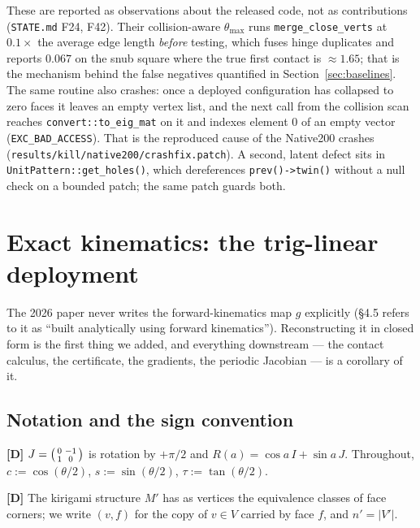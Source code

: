 \documentclass[11pt,a4paper]{article}
\theoremstyle{definition}
\newcommand{\Mprime}{M'}
\newcommand{\file}[1]{\texttt{\small #1}}
\begin{document}
These are reported as observations about the released code, not as contributions
(\file{STATE.md} F24, F42). Their collision-aware $\theta_{\max}$ runs
\file{merge\_close\_verts} at $0.1\times$ the average edge length \emph{before} testing,
which fuses hinge duplicates and reports $0.067$ on the snub square where the true first
contact is $\approx1.65$; that is the mechanism behind the false negatives quantified in
Section~\ref{sec:baselines}. The same routine also crashes: once a deployed configuration has
collapsed to zero faces it leaves an empty vertex list, and the next call from the collision
scan reaches \file{convert::to\_eig\_mat} on it and indexes element $0$ of an empty vector
(\texttt{EXC\_BAD\_ACCESS}). That is the reproduced cause of the Native200 crashes
(\file{results/kill/native200/crashfix.patch}). A second, latent defect sits in
\file{UnitPattern::get\_holes()}, which dereferences \file{prev()->twin()} without a null
check on a bounded patch; the same patch guards both.

\clearpage
\section{Exact kinematics: the trig-linear deployment}
\label{sec:kinematics}

The 2026 paper never writes the forward-kinematics map $g$ explicitly (§4.5 refers to it as
``built analytically using forward kinematics''). Reconstructing it in closed form is the
first thing we added, and everything downstream --- the contact calculus, the certificate,
the gradients, the periodic Jacobian --- is a corollary of it.

\subsection{Notation and the sign convention}

\textbf{[D]} $J=\begin{psmallmatrix}0&-1\\1&0\end{psmallmatrix}$ is rotation by $+\pi/2$ and
$R(a)=\cos a\,I+\sin a\,J$. Throughout, $c:=\cos(\theta/2)$, $s:=\sin(\theta/2)$,
$\tau:=\tan(\theta/2)$.

\textbf{[D]} The kirigami structure $\Mprime$ has as vertices the equivalence classes of
face corners; we write $(v,f)$ for the copy of $v\in V$ carried by face $f$, and
$n'=|V'|$.
\end{document}
